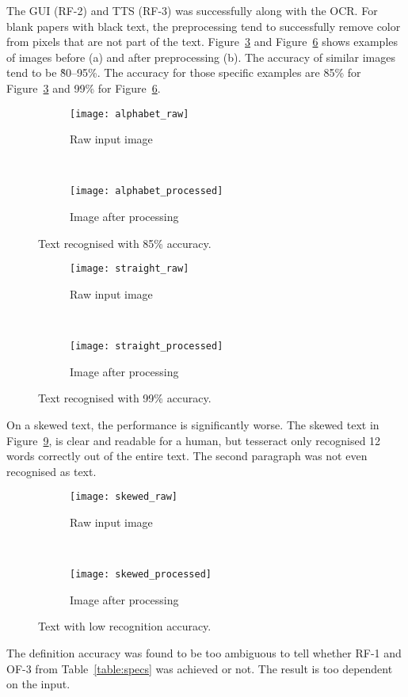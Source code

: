 \documentclass[../main.tex]{subfiles}
\begin{document}
The GUI (RF-2) and TTS (RF-3) was successfully along with the OCR\@. For blank papers with black text, the preprocessing tend to successfully remove color from pixels that are not part of the text. Figure~\ref{fig:alphabet} and Figure~\ref{fig:straight} shows examples of images before (a) and after preprocessing (b). The accuracy of similar images tend to be \~80--95\%. The accuracy for those specific examples are 85\% for Figure~\ref{fig:alphabet} and 99\% for Figure~\ref{fig:straight}.

\begin{figure}[!ht]
  \centering
  \begin{subfigure}[t]{0.48\linewidth}
    \centering
    \texttt{[image: alphabet\_raw]}
    \caption{Raw input image\label{fig:alphabet_a}}
  \end{subfigure}~
  \begin{subfigure}[t]{0.48\linewidth}
    \centering
    \texttt{[image: alphabet\_processed]}
    \caption{Image after processing\label{fig:alphabet_b}}
  \end{subfigure}
  \caption{Text recognised with 85\% accuracy.\label{fig:alphabet}}
\end{figure}

\begin{figure}[!ht]
  \centering
  \begin{subfigure}[t]{0.48\linewidth}
    \centering
    \texttt{[image: straight\_raw]}
    \caption{Raw input image\label{fig:straight_a}}
  \end{subfigure}~
  \begin{subfigure}[t]{0.48\linewidth}
    \centering
    \texttt{[image: straight\_processed]}
    \caption{Image after processing\label{fig:straight_b}}
  \end{subfigure}
  \caption{Text recognised with 99\% accuracy.\label{fig:straight}}
\end{figure}

On a skewed text, the performance is significantly worse. The skewed text in Figure~\ref{fig:skewed}, is clear and readable for a human, but tesseract only recognised 12 words correctly out of the entire text. The second paragraph was not even recognised as text. 

\begin{figure}[!ht]
  \centering
  \begin{subfigure}[t]{0.48\linewidth}
    \centering
    \texttt{[image: skewed\_raw]}
    \caption{Raw input image\label{fig:skewed_a}}
  \end{subfigure}~
  \begin{subfigure}[t]{0.48\linewidth}
    \centering
    \texttt{[image: skewed\_processed]}
    \caption{Image after processing\label{fig:skewed_b}}
  \end{subfigure}
  \caption{Text with low recognition accuracy.\label{fig:skewed}}
\end{figure}

The definition accuracy was found to be too ambiguous to tell whether RF-1 and OF-3 from Table~\ref{table:specs} was achieved or not. The result is too dependent on the input.
\end{document}
